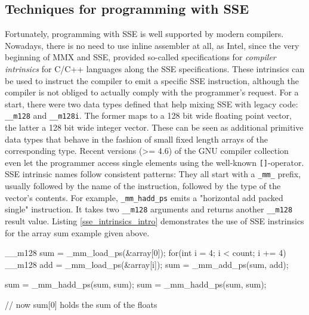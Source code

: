 \subsection{Techniques for programming with SSE}
Fortunately, programming with SSE is well supported by modern compilers. Nowadays, there is no need to use inline assembler at all, as Intel, since the very beginning of MMX and SSE, provided so-called specifications for \emph{compiler intrinsics} for C/C++ languages along the SSE specifications. These intrinsics can be used to instruct the compiler to emit a specific SSE instruction, although the compiler is not obliged to actually comply with the programmer's request. For a start, there were two data types defined that help mixing SSE with legacy code: \texttt{\_\_m128} and \texttt{\_\_m128i}. The former maps to a 128 bit wide floating point vector, the latter a 128 bit wide integer vector. These can be seen as additional primitive data types that behave in the fashion of small fixed length arrays of the corresponding type. Recent versions (>= 4.6) of the GNU compiler collection even let the programmer access single elements using the well-known \texttt{[]}-operator. SSE intrinsic names follow consistent patterns: They all start with a \texttt{\_mm\_} prefix, usually followed by the name of the instruction, followed by the type of the vector's contents. For example, \texttt{\_mm\_hadd\_ps} emits a "horizontal add packed single" instruction. It takes two \texttt{\_\_m128} arguments and returns another \texttt{\_\_m128} result value. Listing \ref{sse_intrinsics_intro} demonstrates the use of SSE instrinsics for the array sum example given above.
\begin{code}[caption={Array sum using SSE instrinsics}, label=sse_intrinsics_intro]
  __m128 sum = _mm_load_ps(&array[0]);
  for(int i = 4; i < count; i += 4) {
    __m128 add = _mm_load_ps(&array[i]);
    sum = _mm_add_ps(sum, add);
  }

  sum = _mm_hadd_ps(sum, sum);
  sum = _mm_hadd_ps(sum, sum);

  // now sum[0] holds the sum of the floats
\end{code}


